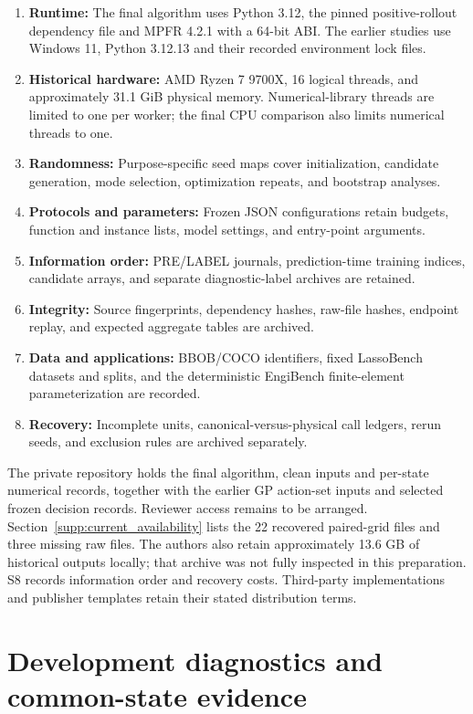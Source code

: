 \documentclass[suppldata]{interact}
\providecommand{\tightlist}{\setlength{\itemsep}{0pt}\setlength{\parskip}{0pt}}
\begin{document}
\begin{enumerate}
\def\labelenumi{\arabic{enumi}.}
\tightlist
\item
  \textbf{Runtime:} The final algorithm uses Python 3.12, the pinned positive-rollout dependency file and MPFR 4.2.1 with a 64-bit ABI. The earlier studies use Windows 11, Python 3.12.13 and their recorded environment lock files.
\item
  \textbf{Historical hardware:} AMD Ryzen 7 9700X, 16 logical threads, and approximately 31.1 GiB physical memory. Numerical-library threads are limited to one per worker; the final CPU comparison also limits numerical threads to one.
\item
  \textbf{Randomness:} Purpose-specific seed maps cover initialization, candidate generation, mode selection, optimization repeats, and bootstrap analyses.
\item
  \textbf{Protocols and parameters:} Frozen JSON configurations retain budgets, function and instance lists, model settings, and entry-point arguments.
\item
  \textbf{Information order:} PRE/LABEL journals, prediction-time training indices, candidate arrays, and separate diagnostic-label archives are retained.
\item
  \textbf{Integrity:} Source fingerprints, dependency hashes, raw-file hashes, endpoint replay, and expected aggregate tables are archived.
\item
  \textbf{Data and applications:} BBOB/COCO identifiers, fixed LassoBench datasets and splits, and the deterministic EngiBench finite-element parameterization are recorded.
\item
  \textbf{Recovery:} Incomplete units, canonical-versus-physical call ledgers, rerun seeds, and exclusion rules are archived separately.
\end{enumerate}

The private repository holds the final algorithm, clean inputs and per-state numerical records, together with the earlier GP action-set inputs and selected frozen decision records. Reviewer access remains to be arranged. Section~\ref{supp:current_availability} lists the 22 recovered paired-grid files and three missing raw files. The authors also retain approximately 13.6 GB of historical outputs locally; that archive was not fully inspected in this preparation. S8 records information order and recovery costs. Third-party implementations and publisher templates retain their stated distribution terms.

\hypertarget{development-diagnostics-and-common-state-evidence}{%
\section{Development diagnostics and common-state evidence}\label{development-diagnostics-and-common-state-evidence}}
\end{document}
